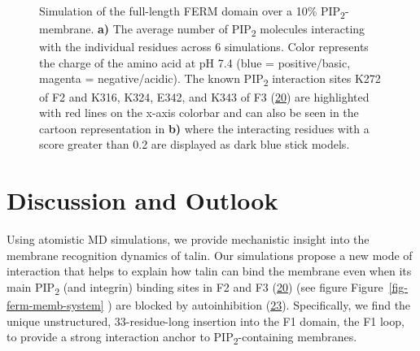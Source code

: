 \documentclass[
  twocolumn]{biophys-new-mod}
\begin{document}
\begin{figure}
\begin{minipage}[t]{\linewidth}
{}

\subcaption{\label{fig-ferm-memb-system}~}
\end{minipage}%

\caption{\label{fig-ferm-further}Simulation of the full-length FERM
domain over a 10\% PIP\textsubscript{2}-membrane. \textbf{a)} The
average number of PIP\textsubscript{2} molecules interacting with the
individual residues across 6 simulations. Color represents the charge of
the amino acid at pH 7.4 (blue = positive/basic, magenta =
negative/acidic). The known PIP\textsubscript{2} interaction sites K272
of F2 and K316, K324, E342, and K343 of F3
(\protect\hyperlink{ref-chinthalapudiInteractionTalinCell2018a}{20}) are
highlighted with red lines on the x-axis colorbar and can also be seen
in the cartoon representation in \textbf{b)} where the interacting
residues with a score greater than 0.2 are displayed as dark blue stick
models.}

\end{figure}

\hypertarget{discussion-and-outlook}{%
\section{Discussion and Outlook}\label{discussion-and-outlook}}

Using atomistic MD simulations, we provide mechanistic insight into the
membrane recognition dynamics of talin. Our simulations propose a new
mode of interaction that helps to explain how talin can bind the
membrane even when its main PIP\textsubscript{2} (and integrin) binding
sites in F2 and F3
(\protect\hyperlink{ref-chinthalapudiInteractionTalinCell2018a}{20})
(see figure Figure~\ref{fig-ferm-memb-system} ) are blocked by
autoinhibition
(\protect\hyperlink{ref-deddenArchitectureTalin1Reveals2019a}{23}).
Specifically, we find the unique unstructured, 33-residue-long insertion
into the F1 domain, the F1 loop, to provide a strong interaction anchor
to PIP\textsubscript{2}-containing membranes.
\end{document}
